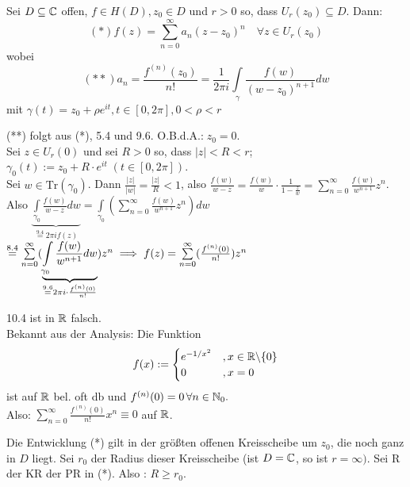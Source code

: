 \documentclass[a4paper,twoside,DIV15,BCOR12mm]{scrbook}
\def\Tr{\text{Tr}}
\def\wegint{\ensuremath{\int\limits_\gamma}}
\begin{document}
\begin{satz}[Potenzreihenentwicklung]
Sei $D \subseteq \mathbb{C}$ offen, $f \in H(D), z_0 \in D$ und $r > 0$ so, dass $U_r(z_0) \subseteq D$. Dann:
$$(*)f(z) = \sum _{n=0}^{\infty}a_n(z-z_0)^n \quad \forall z \in U_r(z_0)$$
wobei
$$(**) a_n = \frac{f^{(n)}(z_0)}{n!} = \frac{1}{2\pi i}\wegint\frac{f(w)}{(w-z_0)^{n+1}}dw$$
mit $\gamma (t) = z_0 + \rho e^{it}, t \in [0,2\pi], 0<\rho <r$
\end{satz}

\begin{beweis}
(**) folgt aus (*), 5.4 und 9.6. O.B.d.A.:$\;z_0 = 0$. \\
Sei $z \in U_r(0)$ und sei $R>0$ so, dass $|z|<R<r$;\\
$\gamma _0(t) := z_0 + R\cdot e^{it} \;(t \in [0,2\pi])$. \\
Sei $w \in \Tr (\gamma _0)$. Dann $\frac{|z|}{|w|} = \frac{|z|}{R} < 1$, also $\frac{f(w)}{w-z} = \frac{f(w)}{w}\cdot \frac{1}{1-\frac{z}{w}} = \sum\limits _{n=0}^{\infty}\frac{f(w)}{w^{n+1}}z^n$.\\
Also $\underbrace{\int\limits _{\gamma _0} \frac{f(w)}{w-z} dw}_{\stackrel{9.4}{=}2\pi if(z)} = \int\limits _{\gamma _0}(\sum\limits _{n=0}^{\infty}\frac{f(w)}{w^{n+1}}z^n)dw $\\
$\stackrel{8.4}{=}\sum\limits _{n=0}^{\infty}(\underbrace{\int\limits _{\gamma _0}\frac{f(w)}{w^{n+1}}dw}_{\stackrel{9.6}{=}2\pi i\cdot\frac{f^{(n)}(0)}{n!}})z^n \implies f(z) = \sum\limits _{n=0}^{\infty}(\frac{f^{(n)}(0)}{n!})z^n$
\end{beweis} 

\begin{bemerkungen}
\item 10.4 ist in $\mathbb{R}$ falsch. \\Bekannt aus der Analysis: Die Funktion
$$f(x) := \begin{cases}e^{-1/x^2} &, x\in\mathbb{R}\backslash\{0\} \\ 0 &, x=0\end{cases}$$ ist auf $\mathbb{R}$ bel. oft db und $f^{(n)}(0) = 0 \,\forall n \in \mathbb{N} _0.$ \\
Also: $\sum\limits _{n=0}^{\infty}\frac{f^{(n)}(0)}{n!}x^n \equiv 0$ auf $\mathbb{R}$.
\item Die Entwicklung (*) gilt in der größten offenen Kreisscheibe um $z_0$, die noch ganz in $D$ liegt. Sei $r_0$ der Radius dieser Kreisscheibe (ist $D = \mathbb{C}$, so ist $r = \infty)$. Sei R der KR der PR in (*). Also : $R \geq r_0$.
\end{bemerkungen}
\end{document}
